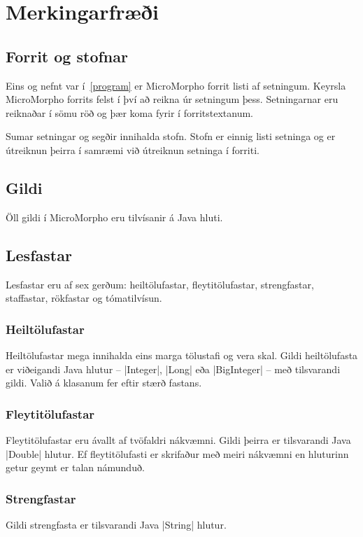 \documentclass[12pt]{article}
\begin{document}
\section{Merkingarfræði}

\subsection{Forrit og stofnar}
Eins og nefnt var í~\ref{program} er MicroMorpho forrit listi af setningum.
Keyrsla MicroMorpho forrits felst í því að reikna úr setningum þess.
Setningarnar eru reiknaðar í sömu röð og þær koma fyrir í forritstextanum.

Sumar setningar og segðir innihalda stofn. Stofn er einnig listi setninga
og er útreiknun þeirra í samræmi við útreiknun setninga í forriti.

\subsection{Gildi}
Öll gildi í MicroMorpho eru tilvísanir á Java hluti.

\subsection{Lesfastar}\label{literals}
Lesfastar eru af sex gerðum: 
heiltölufastar, fleytitölufastar, strengfastar, staffastar,
rökfastar og tómatilvísun.

\subsubsection{Heiltölufastar}
Heiltölufastar mega innihalda eins marga tölustafi og vera skal.
Gildi heiltölufasta er viðeigandi Java hlutur – |Integer|, |Long|
eða |BigInteger| – með tilsvarandi gildi.
Valið á klasanum fer eftir stærð fastans.

\subsubsection{Fleytitölufastar}
Fleytitölufastar eru ávallt af tvöfaldri nákvæmni. Gildi þeirra er
tilsvarandi Java |Double| hlutur. Ef fleytitölufasti er skrifaður með
meiri nákvæmni en hluturinn getur geymt er talan námunduð.

\subsubsection{Strengfastar}
Gildi strengfasta er tilsvarandi Java |String| hlutur.
\end{document}
